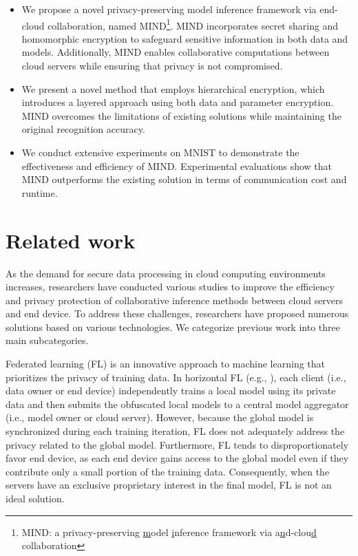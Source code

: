 \documentclass[conference]{IEEEtran}
\begin{document}
\begin{itemize}
    \item We propose a novel privacy-preserving model inference framework via end-cloud collaboration, named MIND\footnote{MIND: a privacy-preserving \underline{m}odel \underline{i}nference framework via a\underline{n}d-clou\underline{d} collaboration}. MIND incorporates secret sharing and homomorphic encryption to safeguard sensitive information in both data and models. Additionally, MIND enables collaborative computations between cloud servers while ensuring that privacy is not compromised.
    
    \item We present a novel method that employs hierarchical encryption, which introduces a layered approach using both data and parameter encryption. MIND overcomes the limitations of existing solutions while maintaining the original recognition accuracy.
    
    \item We conduct extensive experiments on MNIST to demonstrate the effectiveness and efficiency of MIND. Experimental evaluations show that MIND outperforms the existing solution in terms of communication cost and runtime.  
\end{itemize}
\section{Related work}
As the demand for secure data processing in cloud computing environments increases, researchers have conducted various studies to improve the efficiency and privacy protection of collaborative inference methods between cloud servers and end device. To address these challenges, researchers have proposed numerous solutions based on various technologies. We categorize previous work into three main subcategories.

Federated learning (FL) is an innovative approach to machine learning that prioritizes the privacy of training data. In horizontal FL (e.g., \cite{pmlr-v54-mcmahan17a,Gupta2018DistributedLO,9252066}), each client (i.e., data owner or end device) independently trains a local model using its private data and then submits the obfuscated local models to a central model aggregator (i.e., model owner or cloud server). However, because the global model is synchronized during each training iteration, FL does not adequately address the privacy related to the global model. Furthermore, FL tends to disproportionately favor end device, as each end device gains access to the global model even if they contribute only a small portion of the training data. Consequently, when the servers have an exclusive proprietary interest in the final model, FL is not an ideal solution.
\end{document}
